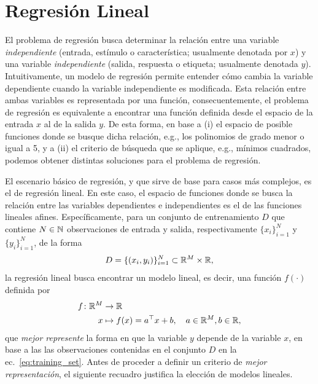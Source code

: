 
\section{Regresión Lineal} 

El problema de regresión busca determinar la relación entre una variable \emph{independiente} (entrada, estímulo o característica; usualmente denotada por $x$) y una variable \emph{independiente} (salida, respuesta o etiqueta; usualmente denotada $y$). Intuitivamente, un modelo de regresión permite entender cómo cambia la variable dependiente cuando la variable independiente es modificada. Esta relación entre ambas variables es representada por una función, consecuentemente, el problema de regresión es equivalente a encontrar una función definida desde el espacio de la entrada $x$ al de la salida $y$. De esta forma, en base a (i) el espacio de posible funciones donde se busque dicha relación, e.g., los polinomios de grado menor o igual a 5, y a (ii) el criterio de búsqueda que se aplique, e.g., mínimos cuadrados, podemos obtener distintas soluciones para el problema de regresión. 

El escenario básico de regresión, y que sirve de base para casos más complejos, es el de regresión lineal. En este caso, el espacio de funciones donde se busca la relación entre las variables dependientes e independientes es el de las funciones lineales afines. Específicamente, para un conjunto de entrenamiento $D$ que contiene $N\in{\mathbb N}$ observaciones de entrada y salida, respectivamente $\{x_i\}_{i=1}^N$ y $\{y_i\}_{i=1}^N$, de la forma
\begin{equation}
	D=\{(x_i,y_i)\}_{i=1}^N\subset {\mathbb R}^M \times {\mathbb R},
	\label{eq:training_set}
\end{equation}
la regresión lineal busca encontrar un modelo lineal, es decir, una función $f(\cdot)$ definida por 
\begin{align}
  f \colon {\mathbb R}^M &\to {\mathbb R}\nonumber\\
  x &\mapsto f(x)=a^\top x + b,\quad a\in{\mathbb R}^M,b\in{\mathbb R},
 \label{eq:reg_lin_fn} 
\end{align}
que \emph{mejor represente} la forma en que la variable $y$ depende de la variable $x$, en base a las las observaciones contenidas en el conjunto $D$ en la ec.~\eqref{eq:training_set}. Antes de proceder a definir un criterio de \emph{mejor representación}, el siguiente recuadro justifica la elección de modelos lineales. 

